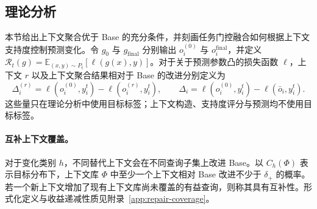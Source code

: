 \ifdefined\ICLRLayout\clearpage\fi
\subsection{理论分析}
\label{sec:theory}

本节给出上下文聚合优于 Base 的充分条件，并刻画任务门控融合如何根据上下文支持度控制预测变化。令 $g_0$ 与 $g_{\mathrm{final}}$ 分别输出 $o_i^{(0)}$ 与 $o_i^{\mathrm{final}}$，并定义 $\mathcal R_t(g)=\mathbb E_{(x,y)\sim P_t}[\ell(g(x),y)]$。对于关于预测参数凸的损失函数 $\ell$，上下文 $r$ 以及上下文聚合结果相对于 Base 的改进分别定义为
\begin{equation}
  \Delta_i^{(r)}
  =\ell(o_i^{(0)},y_i^t)-\ell(o_i^{(r)},y_i^t),
  \qquad
  \Delta_i
  =\ell(o_i^{(0)},y_i^t)-\ell(\bar o_i,y_i^t).
  \label{eq:context_improvements}
\end{equation}
这些量只在理论分析中使用目标标签；上下文构造、支持度评分与预测均不使用目标标签。

\paragraph{互补上下文覆盖。}
对于变化类别 $h$，不同替代上下文会在不同查询子集上改进 Base。以 $C_h(\Phi)$ 表示目标分布下，上下文库 $\Phi$ 中至少一个上下文相对 Base 改进不少于 $\delta_+$ 的概率。若一个新上下文增加了现有上下文库尚未覆盖的有益查询，则称其具有互补性。形式化定义与收益递减性质见附录~\ref{app:repair-coverage}。

